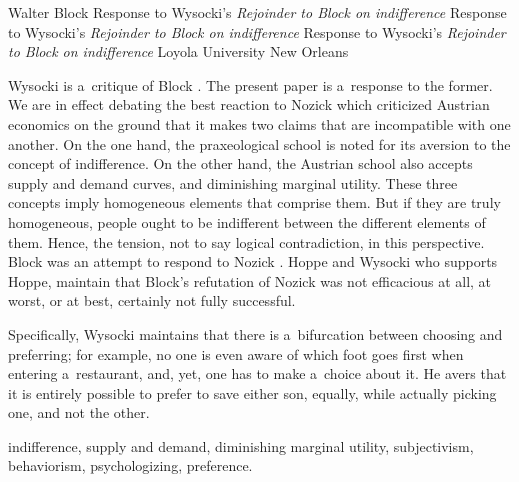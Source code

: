 \begin{artengenv}{Walter Block}
	{Response to Wysocki's \textit{Rejoinder to Block on indifference}}
	{Response to Wysocki's \textit{Rejoinder to Block on indifference}}
	{Response to Wysocki's \textit{Rejoinder to Block on indifference}}
	{Loyola University New Orleans}
	{Wysocki 
	\parencite*[][]{wysocki_rejoinder_2024} %
	 is a~critique of Block 
	\parencite*[][]{block_response_2022}. %
	 The present paper is a~response to the former. We are in effect debating the best reaction to Nozick 
	\parencite*[][]{nozick_austrian_1977} %
	 which criticized Austrian economics on the ground that it makes two claims that are incompatible with one another. On the one hand, the praxeological school is noted for its aversion to the concept of indifference. On the other hand, the Austrian school also accepts supply and demand curves, and diminishing marginal utility. These three concepts imply homogeneous elements that comprise them. But if they are truly homogeneous, people ought to be indifferent between the different elements of them. Hence, the tension, not to say logical contradiction, in this perspective. Block 
	\parencite*[][]{block_robert_1980} %
	 was an attempt to respond to Nozick 
	\parencite*[][]{nozick_austrian_1977}. %
	 Hoppe 
	\parencites*[][]{hoppe_note_2005}[][]{hoppe_must_2005}[][]{hoppe_further_2009} %
	 and Wysocki 
	\parencites*[][]{wysocki_indifference_2016}[][]{wysocki_caplan_2017}[][]{wysocki_problem_2021}[][]{wysocki_rejoinder_2024} %
	 who supports Hoppe, maintain that Block's refutation of Nozick 
	\parencite*[][]{nozick_austrian_1977} %
	 was not efficacious at all, at worst, or at best, certainly not fully successful.
	
	
	
	Specifically, Wysocki maintains that there is a~bifurcation between choosing and preferring; for example, no one is even aware of which foot goes first when entering a~restaurant, and, yet, one has to make a~choice about it. He avers that it is entirely possible to prefer to save either son, equally, while actually picking one, and not the other.
	}
	{indifference, supply and demand, diminishing marginal utility, subjectivism, behaviorism, psychologizing, preference.}





\end{artengenv}
